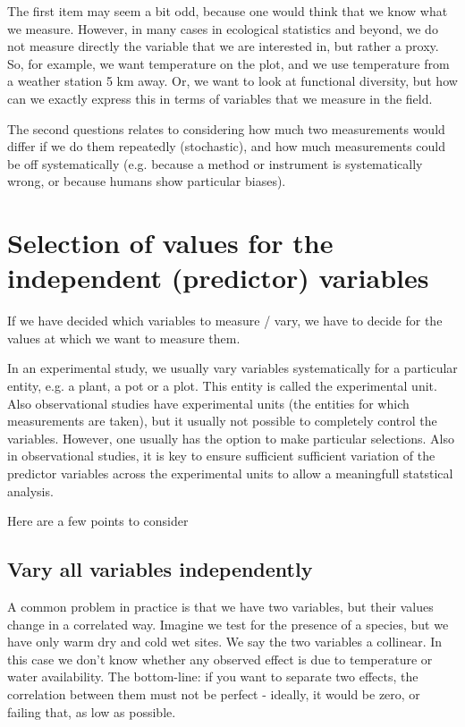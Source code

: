 \documentclass[a4paper,twoside]{tufte-book}\usepackage[]{graphicx}\usepackage[]{color}
\begin{document}
The first item may seem a bit odd, because one would think that we know what we measure. However, in many cases in ecological statistics and beyond, we do not measure directly the variable that we are interested in, but rather a proxy. So, for example, we want temperature on the plot, and we use temperature from a weather station 5 km away. Or, we want to look at functional diversity, but how can we exactly express this in terms of variables that we measure in the field.

The second questions relates to considering how much two measurements would differ if we do them repeatedly (stochastic), and how much measurements could be off systematically (e.g. because a method or instrument is systematically wrong, or because humans show particular biases).


\section{Selection of values for the independent (predictor) variables}

If we have decided which variables to measure / vary, we have to decide for the values at which we want to measure them. 

In an experimental study, we usually vary variables systematically for a particular entity, e.g. a plant, a pot or a plot. This entity is called the experimental unit. Also observational studies have experimental units (the entities for which measurements are taken), but it usually not possible to completely control the variables. However, one usually has the option to make particular selections. Also in observational studies, it is key to ensure sufficient sufficient variation of the predictor variables across the experimental units to allow a meaningfull statstical analysis.

Here are a few points to consider

\subsection{Vary all variables independently}

A common problem in practice is that we have two variables,  but their values change in a correlated way. Imagine we test for the presence of a species, but we have only warm dry and cold wet sites. We say the two variables a collinear. In this case we don't know whether any observed effect is due to temperature or water availability. The bottom-line: if you want to separate two effects, the correlation between them must not be perfect - ideally, it would be zero, or failing that, as low as possible. 
\end{document}
